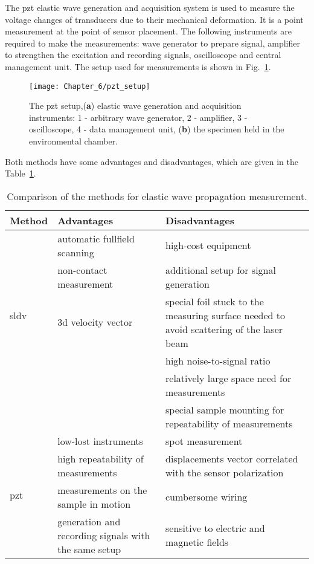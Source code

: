 The \ac{pzt} elastic wave generation and acquisition system is used to measure the voltage changes of transducers due to their mechanical deformation.
It is a point measurement at the point of sensor placement.
The following instruments are required to make the measurements: wave generator to prepare signal, amplifier to strengthen the excitation and recording signals, oscilloscope and central management unit.
The setup used for measurements is shown in Fig.~\ref{fig:pzt_setup}.
\begin{figure}[t]
	\begin{center}
		\texttt{[image: Chapter\_6/pzt\_setup]}
	\end{center}
	\caption{The \ac{pzt} setup,(\textbf{a}) elastic wave generation and acquisition instruments:  1 - arbitrary wave generator, 2 - amplifier, 3 - oscilloscope, 4 - data management unit, (\textbf{b}) the specimen held in the environmental chamber.}
	\label{fig:pzt_setup}
\end{figure}

Both methods have some advantages and disadvantages, which are given in the Table~\ref{tab:method_comp}.
\begin{table}[H]
	\small
	\tabcolsep=0.75cm
	\caption{\label{tab:method_comp}Comparison of the methods for elastic wave propagation measurement.}
	\begin{tabular}{p{}>{\raggedright}p{}>{\raggedright \arraybackslash}p{}}
		\toprule
		\textbf{Method} &\textbf{Advantages} & \textbf{Disadvantages}\\\midrule
		\multirow{5}{*}{\ac{sldv}}   & \tabitem automatic fullfield scanning & \tabitem high-cost equipment\\ & \tabitem non-contact measurement & \tabitem additional setup for signal generation \\
		& \tabitem \ac{3d} velocity vector & \tabitem special foil stuck to the measuring surface needed to avoid scattering of the laser beam\\
		& & \tabitem high noise-to-signal ratio\\
		& & \tabitem relatively large space need for measurements \\
		& & \tabitem special sample mounting for repeatability of measurements \\
		\midrule
		\multirow{5}{*}{\ac{pzt}} & \tabitem low-lost instruments & \tabitem spot measurement\\
		& \tabitem high repeatability of measurements & \tabitem displacements vector correlated with the sensor polarization\\
		& \tabitem measurements on the sample in motion & \tabitem cumbersome wiring\\
		& \tabitem generation and recording signals with the same setup & \tabitem sensitive to electric and magnetic fields\\		
		\bottomrule
	\end{tabular}
\end{table}


